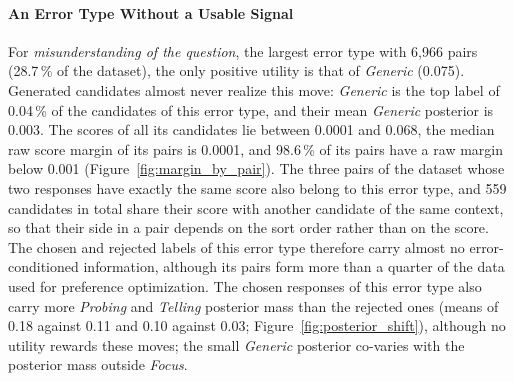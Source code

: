     \paragraph{An Error Type Without a Usable Signal}
    For \textit{misunderstanding of the question}, the largest error type with 6,966 pairs (28.7\,\% of the dataset), the only positive utility is that of \textit{Generic} (0.075). Generated candidates almost never realize this move: \textit{Generic} is the top label of 0.04\,\% of the candidates of this error type, and their mean \textit{Generic} posterior is 0.003. The scores of all its candidates lie between 0.0001 and 0.068, the median raw score margin of its pairs is 0.0001, and 98.6\,\% of its pairs have a raw margin below 0.001 (Figure~\ref{fig:margin_by_pair}). The three pairs of the dataset whose two responses have exactly the same score also belong to this error type, and 559 candidates in total share their score with another candidate of the same context, so that their side in a pair depends on the sort order rather than on the score. The chosen and rejected labels of this error type therefore carry almost no error-conditioned information, although its pairs form more than a quarter of the data used for preference optimization. The chosen responses of this error type also carry more \textit{Probing} and \textit{Telling} posterior mass than the rejected ones (means of 0.18 against 0.11 and 0.10 against 0.03; Figure~\ref{fig:posterior_shift}), although no utility rewards these moves; the small \textit{Generic} posterior co-varies with the posterior mass outside \textit{Focus}.

